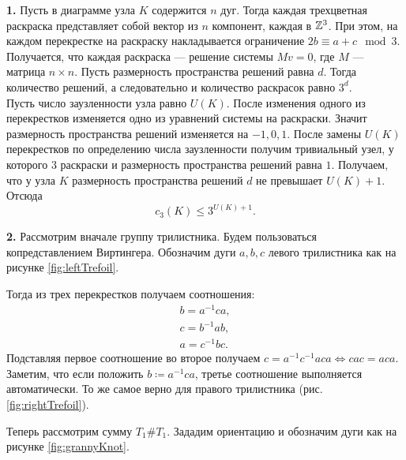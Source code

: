 \documentclass[a4paper]{article}
\begin{document}
\textbf{1.} Пусть в диаграмме узла \( K \) содержится \( n \) дуг.
Тогда каждая трехцветная раскраска представляет собой вектор из \( n
\) компонент, каждая в \( {\mathbb Z}^3 \). При этом, на каждом перекрестке на
раскраску накладывается ограничение \( 2b \equiv a + c\mod 3 \).
Получается, что каждая раскраска --- решение системы \( Mv = 0 \),
где \( M \) --- матрица \( n \times n \). Пусть размерность
пространства решений равна \( d \). Тогда количество решений, а
следовательно и количество раскрасок равно \( 3^d \).\\
Пусть число заузленности узла равно \( U(K) \). После изменения
одного из перекрестков изменяется одно из уравнений системы на
раскраски. Значит размерность пространства решений изменяется на \(
-1,0,1 \). После замены \( U(K) \) перекрестков по определению числа
заузленности получим тривиальный узел, у которого \( 3 \) раскраски и
размерность пространства решений равна \( 1 \).
Получаем, что у узла \( K \) размерность пространства решений \( d \) не
превышает \( U(K) + 1 \). Отсюда
\[
  c_3(K) \le 3^{U(K) + 1}.
\]

\textbf{2.} Рассмотрим вначале группу трилистника. Будем пользоваться
копредставлением Виртингера. Обозначим дуги \( a,b,c \) левого
трилистника как на рисунке \ref{fig:leftTrefoil}.

Тогда из трех перекрестков получаем соотношения:
\begin{gather*}
  b = a^{-1}ca,\\
  c = b^{-1}ab,\\
  a = c^{-1}bc.
\end{gather*}
Подставляя первое соотношение во второе получаем \( c =
a^{-1}c^{-1}aca \iff cac=aca\).
Заметим, что если положить \( b \coloneqq a^{-1}ca \), третье
соотношение выполняется автоматически.
То же самое верно для правого трилистника (рис. \ref{fig:rightTrefoil}).

Теперь рассмотрим сумму \( T_1 \# T_1\). Зададим ориентацию и
обозначим дуги как на рисунке \ref{fig:grannyKnot}.
\end{document}
